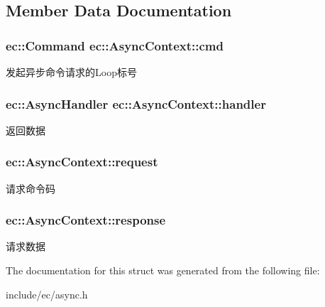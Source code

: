 \subsection{Member Data Documentation}
\hypertarget{structec_1_1AsyncContext_a8f7efe1fb35eb8dac2a172ac9bf00816}{
\subsubsection[{cmd}]{\setlength{\rightskip}{0pt plus 5cm}ec\-::\-Command ec\-::\-Async\-Context\-::cmd}}\label{structec_1_1AsyncContext_a8f7efe1fb35eb8dac2a172ac9bf00816}
发起异步命令请求的\-Loop标号 \hypertarget{structec_1_1AsyncContext_abda01a357a1b54062f5369c5a359a489}{
\subsubsection[{handler}]{\setlength{\rightskip}{0pt plus 5cm}ec\-::\-Async\-Handler ec\-::\-Async\-Context\-::handler}}\label{structec_1_1AsyncContext_abda01a357a1b54062f5369c5a359a489}
返回数据 \hypertarget{structec_1_1AsyncContext_ae2421cc415943bfbe6587336bafed5e4}{
\subsubsection[{request}]{ ec\-::\-Async\-Context\-::request}}\label{structec_1_1AsyncContext_ae2421cc415943bfbe6587336bafed5e4}
请求命令码 \hypertarget{structec_1_1AsyncContext_a4cba44af18997a45d803e4d2533bc303}{
\subsubsection[{response}]{ ec\-::\-Async\-Context\-::response}}\label{structec_1_1AsyncContext_a4cba44af18997a45d803e4d2533bc303}
请求数据 

The documentation for this struct was generated from the following file\-:\begin{DoxyCompactItemize}
\item 
include/ec/async.\-h\end{DoxyCompactItemize}
